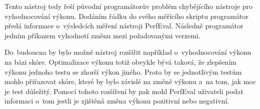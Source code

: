Tento nástroj tedy řeší původní programátorův problém chybějícího nástroje pro vyhodnocování výkonu.
Dodáním řádku do svého měřícího skriptu programátor předá informace o~výsledcích měření nástroji PerfEval.
Následně programátor jedním příkazem vyhodnotí změnu mezi požadovanými verzemi.

Do~budoucna by bylo možné nástroj rozšířit například o~vyhodnocování výkonu na bázi skóre.
Optimalizace výkonu totiž obvykle bývá taková, že zlepšením výkonu jednoho testu se zhorší výkon jiného.
Proto by se jednotlivým testům mohlo přiřazovat skóre, které by bylo závislé na změně výkonu a~na tom, jak moc je test důležitý.
Pomocí tohoto rozšíření by pak mohl PerfEval uživateli podat informaci o~tom jestli je zjištěná změna výkonu
pozitivní nebo negativní.